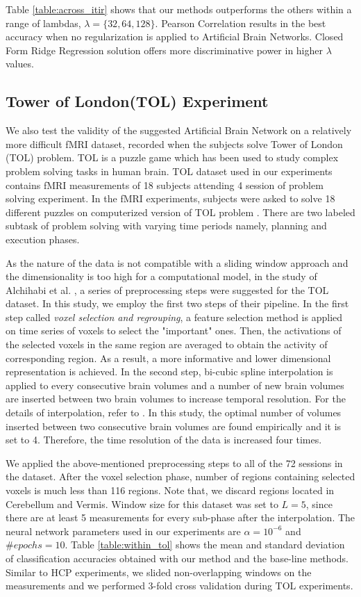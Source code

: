 \documentclass[runningheads]{llncs}
\begin{document}
Table \ref{table:across_itir} shows that our methods outperforms the others within a range of lambdas, $\lambda = \{ 32, 64, 128 \}$. Pearson Correlation results in the best accuracy when no regularization is applied to Artificial Brain Networks. Closed Form Ridge Regression solution offers more discriminative power in higher $\lambda$ values. 

\subsection{Tower of London(TOL) Experiment}

We also test the validity of the suggested Artificial Brain Network  on a relatively more difficult fMRI dataset, recorded when the subjects solve Tower of London (TOL) problem. TOL is a puzzle game which has been used to study complex problem solving tasks in human brain. TOL dataset used in our experiments contains fMRI measurements of 18 subjects attending 4 session of problem solving experiment. In the fMRI experiments, subjects were asked to solve 18 different puzzles on computerized version of TOL problem \cite{newman2009fmri}. There are two labeled subtask of problem solving with varying time periods namely, planning and execution phases. 

As the nature of the data is not compatible with a sliding window approach and the dimensionality is too high for a computational model, in the study of Alchihabi et al. \cite{alchihabi2018decoding}, a series of preprocessing steps were suggested for the TOL dataset. In this study, we employ the first two steps of their pipeline. In the first step called \textit{voxel selection and regrouping}, a feature selection method is applied on time series of voxels to select the "important" ones. Then, the activations of the selected voxels in the same region are averaged to obtain the activity of corresponding region. As a result, a more informative and lower dimensional representation is achieved. In the second step, bi-cubic spline interpolation is applied to every consecutive brain volumes and a number of new brain volumes are inserted between two brain volumes  to increase temporal resolution. For the details of interpolation, refer to \cite{alchihabi2018decoding}. In this study, the optimal number of volumes inserted between two consecutive brain volumes are found empirically and it is set to 4. Therefore, the time resolution of the data is increased four times.

We applied the above-mentioned preprocessing steps to all of the 72 sessions in the dataset. After the voxel selection phase, number of regions containing selected voxels is much less than 116 regions. Note that, we discard regions located in Cerebellum and Vermis. Window size for this dataset was set to $L = 5$, since there are  at least 5 measurements for every sub-phase after the interpolation. The neural network parameters used in our experiments are $\alpha=10^{-6}$ and $\# epochs = 10$. Table \ref{table:within_tol} shows the mean and standard deviation of classification accuracies obtained with our method and the base-line methods. Similar to HCP experiments, we slided non-overlapping windows on the measurements and we performed 3-fold cross validation during TOL experiments. 
\end{document}
